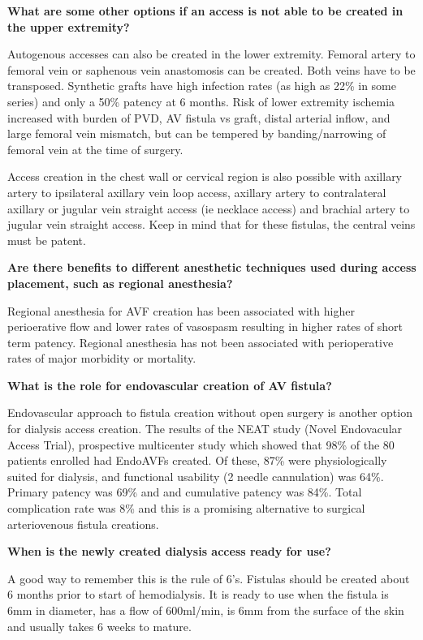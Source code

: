 \documentclass[
]{book}
\begin{document}
\textbf{What are some other options if an access is not able to be created in
the upper extremity?}

Autogenous accesses can also be created in the lower extremity. Femoral
artery to femoral vein or saphenous vein anastomosis can be created.
Both veins have to be transposed. Synthetic grafts have high infection
rates (as high as 22\% in some series) and only a 50\% patency at 6
months.\citep{antoniou2009, lazarides2018, pike2019} Risk of lower
extremity ischemia increased with burden of PVD, AV fistula vs graft,
distal arterial inflow, and large femoral vein mismatch, but can be
tempered by banding/narrowing of femoral vein at the time of
surgery.\citep{antoniou2009, bourquelot2012, gradman2005}

Access creation in the chest wall or cervical region is also possible
with axillary artery to ipsilateral axillary vein loop access, axillary
artery to contralateral axillary or jugular vein straight access (ie
necklace access) and brachial artery to jugular vein straight access.
Keep in mind that for these fistulas, the central veins must be patent.

\textbf{Are there benefits to different anesthetic techniques used during
access placement, such as regional anesthesia?}

Regional anesthesia for AVF creation has been associated with higher
perioerative flow and lower rates of vasospasm resulting in higher rates
of short term patency. Regional anesthesia has not been associated with
perioperative rates of major morbidity or mortality.\citep{aitken2016, siracuse2014}

\textbf{What is the role for endovascular creation of AV fistula?}

Endovascular approach to fistula creation without open surgery is
another option for dialysis access creation. The results of the NEAT
study (Novel Endovacular Access Trial), prospective multicenter study
which showed that 98\% of the 80 patients enrolled had EndoAVFs created.
Of these, 87\% were physiologically suited for dialysis, and functional
usability (2 needle cannulation) was 64\%. Primary patency was 69\% and
and cumulative patency was 84\%. Total complication rate was 8\% and this
is a promising alternative to surgical arteriovenous fistula creations.
\citep{lok2017}

\textbf{When is the newly created dialysis access ready for use?}

A good way to remember this is the rule of 6's. Fistulas should be
created about 6 months prior to start of hemodialysis. It is ready to
use when the fistula is 6mm in diameter, has a flow of 600ml/min, is 6mm
from the surface of the skin and usually takes 6 weeks to mature.
\end{document}
